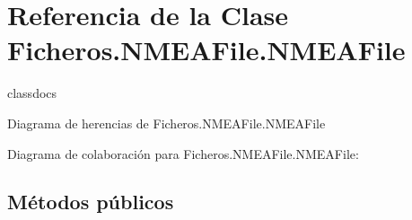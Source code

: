 \section{Referencia de la Clase Ficheros.\-N\-M\-E\-A\-File.\-N\-M\-E\-A\-File}
\label{classFicheros_1_1NMEAFile_1_1NMEAFile}


classdocs  




Diagrama de herencias de Ficheros.\-N\-M\-E\-A\-File.\-N\-M\-E\-A\-File


Diagrama de colaboración para Ficheros.\-N\-M\-E\-A\-File.\-N\-M\-E\-A\-File\-:
\subsection*{Métodos públicos}
